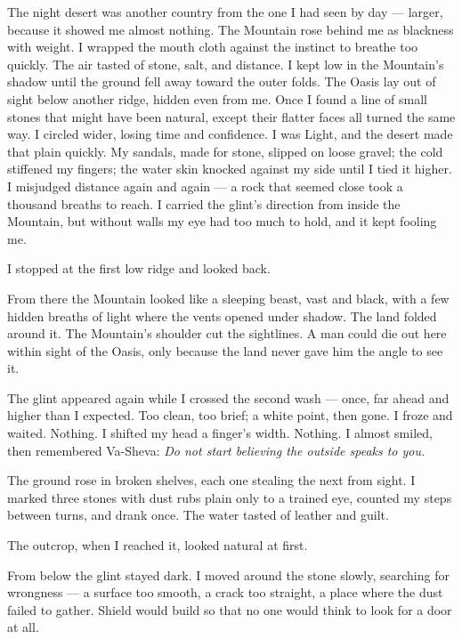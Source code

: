 The night desert was another country from the one I had seen by day --- larger, because it showed me almost nothing. The Mountain rose behind me as blackness with weight. I wrapped the mouth cloth against the instinct to breathe too quickly. The air tasted of stone, salt, and distance. 
I kept low in the Mountain's shadow until the ground fell away toward the outer folds. The Oasis lay out of sight below another ridge, hidden even from me. Once I found a line of small stones that might have been natural, except their flatter faces all turned the same way. I circled wider, losing time and confidence. I was Light, and the desert made that plain quickly. My sandals, made for stone, slipped on loose gravel; the cold stiffened my fingers; the water skin knocked against my side until I tied it higher. I misjudged distance again and again --- a rock that seemed close took a thousand breaths to reach. I carried the glint's direction from inside the Mountain, but without walls my eye had too much to hold, and it kept fooling me.\par

I stopped at the first low ridge and looked back.\par

From there the Mountain looked like a sleeping beast, vast and black, with a few hidden breaths of light where the vents opened under shadow. The land folded around it. The Mountain's shoulder cut the sightlines. A man could die out here within sight of the Oasis, only because the land never gave him the angle to see it.\par

The glint appeared again while I crossed the second wash --- once, far ahead and higher than I expected. Too clean, too brief; a white point, then gone. I froze and waited. Nothing. I shifted my head a finger's width. Nothing. I almost smiled, then remembered Va-Sheva: \textit{Do not start believing the outside speaks to you.}\par

The ground rose in broken shelves, each one stealing the next from sight. I marked three stones with dust rubs plain only to a trained eye, counted my steps between turns, and drank once. The water tasted of leather and guilt.\par

The outcrop, when I reached it, looked natural at first.\par

From below the glint stayed dark. I moved around the stone slowly, searching for wrongness --- a surface too smooth, a crack too straight, a place where the dust failed to gather. Shield would build so that no one would think to look for a door at all.\par

